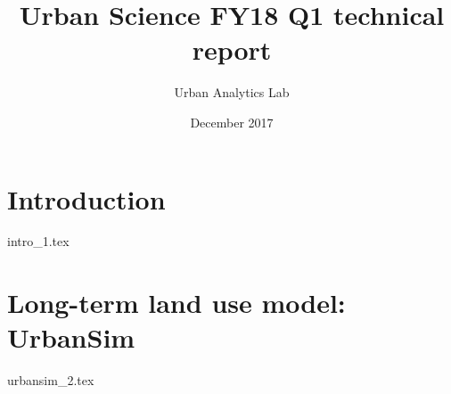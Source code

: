 \documentclass[onecolumn,10pt]{IEEEtran}
\title{Urban Science FY18 Q1 technical report}
\author{Urban Analytics Lab}
\date{December 2017}
\begin{document}
\maketitle
\begin{abstract}

\end{abstract}

\section{Introduction}
{intro_1.tex}

\section{Long-term land use model: UrbanSim}
{urbansim_2.tex}




\end{document}

